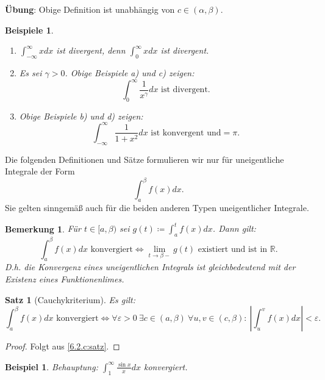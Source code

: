 \documentclass[12pt]{extreport} %
\newcommand{\R}{\mathbb{R}}
\theoremstyle{named}
\theoremstyle{itshape}
\newtheorem{satz}[unnamedtheorem]{Satz}
\theoremstyle{normal}
\newtheorem*{beispiel*}{Beispiel}
\newtheorem*{beispiele}{Beispiele}
\newtheorem*{bemerkung}{Bemerkung}
\begin{document}
{\textbf{Übung}: Obige Definition ist unabhängig von $c \in (\alpha, \beta)$.

\begin{beispiele} ~\
	\begin{enumerate}
		\item $\int_{-\infty}^{\infty} x dx$ ist divergent, denn $\int_{0}^{\infty} x dx$ ist divergent. 
		\item Es sei $\gamma > 0$. Obige Beispiele a) und c) zeigen:
			$$ \int_{0}^{\infty} \frac{1}{x^{\gamma}} dx \text{ ist divergent.} $$
		\item Obige Beispiele b) und d) zeigen:
			$$ \int_{-\infty}^{\infty} \frac{1}{1 + x^{2}} dx \text{ ist konvergent und} = \pi. $$
	\end{enumerate}
\end{beispiele}

Die folgenden Definitionen und Sätze formulieren wir nur für uneigentliche Integrale der Form
	$$ \int_{a}^{\beta} f(x) dx. $$
Sie gelten sinngemä{\ss} auch für die beiden anderen Typen uneigentlicher Integrale.

\begin{bemerkung}
Für $t \in [a, \beta)$ sei $g(t) \coloneqq \int_{a}^{t} f(x) dx$. Dann gilt:
	$$ \int_{a}^{\beta} f(x) dx \text{ konvergiert} \iff \lim_{t \rightarrow \beta-} g(t) \text{ existiert und ist in }\R. $$
D.h. die Konvergenz eines uneigentlichen Integrals ist gleichbedeutend mit der Existenz eines Funktionenlimes.
\end{bemerkung}
	

\begin{satz}[Cauchykriterium] \label{11.1:prop-Cauchykriterium}
	Es gilt: 
	$$\int_{a}^{\beta} f(x) dx \text{ konvergiert} \iff 
	\forall \varepsilon > 0 ~\exists c \in (a, \beta) ~ \forall u, v \in (c, \beta): ~ \left| \int_{u}^{v} f(x) dx \right| < \varepsilon.  $$
\end{satz}

\begin{proof}
Folgt aus \ref{6.2.c:satz}.
\end{proof}


\begin{beispiel*}
	Behauptung: $\int_{1}^{\infty} \frac{\sin x}{x} dx$ konvergiert.	
\end{beispiel*}

}
\end{document}
